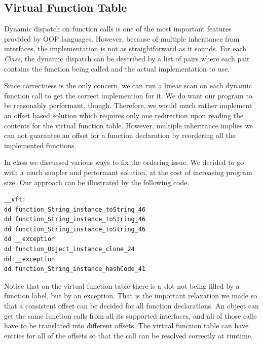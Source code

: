 \documentclass[12pt,letterpaper]{article}
\begin{document}
\subsection{Virtual Function Table}
Dynamic dispatch on function calls is one of the most important features provided by OOP languages.
However, because of multiple inheritance from interfaces, the implementation is not as straightforward as it sounds.
For each \emph{Class}, the dynamic dispatch can be described by a list of pairs where each pair contains the function being called and the actual implementation to use.

Since correctness is the only concern, we can run a linear scan on each dynamic function call to get the correct implemention for it.
We do want our program to be reasonably performant, though.
Therefore, we would much rather implement an offset based solution which requires only one redirection upon reading the contents for the virtual function table.
However, multiple inheritance implies we can not guarantee an offset for a function declaration by reordering all the implemented functions.

In class we discussed various ways to fix the ordering issue.
We decided to go with a much simpler and performant solution, at the cost of increasing program size.
Our approach can be illustrated by the following code.

\begin{lstlisting}
__vft:
dd function_String_instance_toString_46
dd function_String_instance_toString_46
dd function_String_instance_toString_46
dd __exception
dd function_Object_instance_clone_24
dd __exception
dd function_String_instance_hashCode_41
\end{lstlisting}

Notice that on the virtual function table there is a slot not being filled by a function label, but by an exception.
That is the important relaxation we made so that a consistent offset can be decided for all function declarations.
An object can get the same function calls from all its supported interfaces, and all of those calls have to be translated into different offsets.
The virtual function table can have entries for all of the offsets so that the call can be resolved correctly at runtime.
\end{document}
